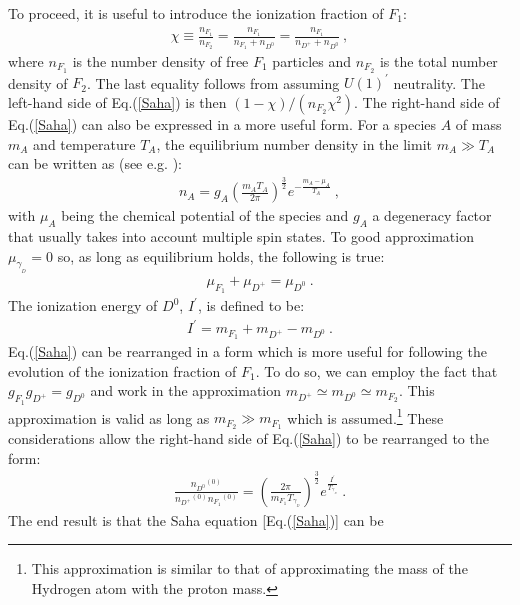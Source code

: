 \documentclass[12pt]{article}
\begin{document}
To proceed, it is useful to introduce the ionization fraction of $F _1$:
%
\begin{eqnarray}
\chi \equiv \frac{n _{F_1}}{n _{F_2}} = \frac{n _{F_1}}{n _{F_1} + n _{D
^0}} = \frac{n _{F_1}}{n _{D ^+} + n _{D ^0}} \ ,
\end{eqnarray}
%
where $n _{F_1}$ is the number density of free $F_1$ particles and $n
_{F_2}$ is the total number density of $F_2$. The last equality follows
from assuming $U(1) ^{'}$ neutrality. The left-hand side of
Eq.(\ref{Saha}) is then $(1-\chi)/(n _{F_2}\chi ^2)$. The right-hand
side of Eq.(\ref{Saha}) can also be expressed in a more useful form. For
a species $A$ of mass $m _A$ and temperature $T _A$, the equilibrium
number density in the limit $m _A \gg T _A$ can be written as (see e.g.
\cite{dodelson}):
%
\begin{eqnarray}
n _A = g _A \left ( \frac{m _A T _A}{2\pi} \right ) ^{\frac{3}{2}} e
^{-\frac{m _A - \mu _A}{T _A}} \ ,
\end{eqnarray}
%
with $\mu _A$ being the chemical potential of the species and $g _A$ a
degeneracy factor that usually takes into account multiple spin states.
To good approximation $\mu _{\gamma _{_D}} = 0$ so, as long as
equilibrium holds, the following is true:
%
\begin{eqnarray}
\mu _{F_1} + \mu _{D ^+} = \mu _{D ^0} \ .
\end{eqnarray}
%
The ionization energy of $D ^0$, $I ^{'}$, is defined to be:
%
\begin{eqnarray}
I ^{'} = m _{F_1} + m _{D ^+} - m _{D ^0} \ .
\end{eqnarray}
%
Eq.(\ref{Saha}) can be rearranged in a form which is more useful for
following the evolution of the ionization fraction of $F _1$. To do so,
we can employ the fact that $g _{F_1}g _{D ^+} = g _{D ^0}$ and work in
the approximation $m _{D ^+} \simeq m _{D ^0} \simeq m _{F_2}$. This
approximation is valid as long as $m _{F_2} \gg m _{F_1}$ which is
assumed.\footnote{This approximation is similar to that of approximating
the mass of the Hydrogen atom with the proton mass.} These
considerations allow the right-hand side of Eq.(\ref{Saha}) to be
rearranged to the form:
%
\begin{eqnarray}
\frac{{n _{D ^0}}^{(0)}}{{n_{D ^+}}^{(0)}{n _{F_1}}^{(0)}} = \left (
\frac{2\pi}{m _{F_1}T _{\gamma _{_D}}} \right ) ^{\frac{3}{2}} e
^{\frac{I ^{'}}{T _{\gamma _{_D}}}} \ .
\label{Saha1}
\end{eqnarray}
%
The end result is that the Saha equation [Eq.(\ref{Saha})] can be
\end{document}
